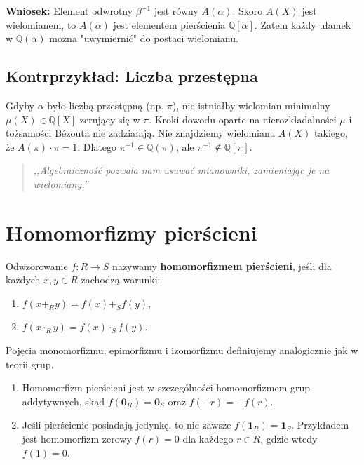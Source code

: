 \textbf{Wniosek:} Element odwrotny $\beta^{-1}$ jest równy $A(\alpha)$. Skoro $A(X)$ jest wielomianem, to $A(\alpha)$ jest elementem pierścienia $\mathbb{Q}[\alpha]$. Zatem każdy ułamek w $\mathbb{Q}(\alpha)$ można "uwymiernić" do postaci wielomianu.

\subsection*{Kontrprzykład: Liczba przestępna}
Gdyby $\alpha$ było liczbą przestępną (np. $\pi$), nie istniałby wielomian minimalny $\mu(X) \in \mathbb{Q}[X]$ zerujący się w $\pi$. Kroki dowodu oparte na nierozkładalności $\mu$ i tożsamości Bézouta nie zadziałają. Nie znajdziemy wielomianu $A(X)$ takiego, że $A(\pi) \cdot \pi = 1$. Dlatego $\pi^{-1} \in \mathbb{Q}(\pi)$, ale $\pi^{-1} \notin \mathbb{Q}[\pi]$.

\begin{quote}
    \textit{,,Algebraiczność pozwala nam usuwać mianowniki, zamieniając je na wielomiany.''}
\end{quote}

\section{Homomorfizmy pierścieni}

\begin{definition}
    Odwzorowanie $f: R \to S$ nazywamy \textbf{homomorfizmem pierścieni}, jeśli dla każdych $x, y \in R$ zachodzą warunki:
    \begin{enumerate}
        \item $f(x +_R y) = f(x) +_S f(y)$,
        \item $f(x \cdot_R y) = f(x) \cdot_S f(y)$.
    \end{enumerate}
    Pojęcia monomorfizmu, epimorfizmu i izomorfizmu definiujemy analogicznie jak w teorii grup.
\end{definition}

\begin{remark}
    \begin{enumerate}[label=\arabic*)]
        \item Homomorfizm pierścieni jest w szczególności homomorfizmem grup addytywnych, skąd $f(\mathbf{0}_R) = \mathbf{0}_S$ oraz $f(-r) = -f(r)$.
        \item Jeśli pierścienie posiadają jedynkę, to nie zawsze $f(\mathbf{1}_R) = \mathbf{1}_S$. Przykładem jest homomorfizm zerowy $f(r) = 0$ dla każdego $r \in R$, gdzie wtedy $f(1) = 0$.
    \end{enumerate}
\end{remark}

